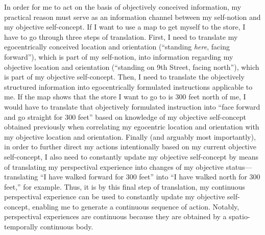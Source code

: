 In order for me to act on the basis of objectively conceived
information, my practical reason must serve as an information channel
between my self-notion and my objective self-concept. If I want to use a
map to get myself to the store, I have to go through three steps of
translation. First, I need to translate my egocentrically conceived
location and orientation (``standing \emph{here}, facing forward''),
which is part of my self-notion, into information regarding my objective
location and orientation (``standing on 9th Street, facing north''),
which is part of my objective self-concept. Then, I need to translate
the objectively structured information into egocentrically formulated
instructions applicable to me. If the map shows that the store I want to
go to is 300 feet north of me, I would have to translate that
objectively formulated instruction into ``face forward and go straight
for 300 feet'' based on knowledge of my objective self-concept obtained
previously when correlating my egocentric location and orientation with
my objective location and orientation. Finally (and arguably most
importantly), in order to further direct my actions intentionally based
on my current objective self-concept, I also need to constantly update
my objective self-concept by means of translating my perspectival
experience into changes of my objective status---translating ``I have
walked forward for 300 feet'' into ``I have walked north for 300 feet,''
for example. Thus, it is by this final step of translation, my
continuous perspectival experience can be used to constantly update my
objective self-concept, enabling me to generate a continuous sequence of
action. Notably, perspectival experiences are continuous because they
are obtained by a spatio-temporally continuous body.

